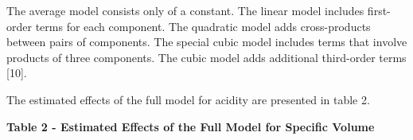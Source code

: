 
The average model consists only of a constant. The linear model includes
first-order terms for each component. The quadratic model adds
cross-products between pairs of components. The special cubic model
includes terms that involve products of three components. The cubic
model adds additional third-order terms {[}10{]}.

The estimated effects of the full model for acidity are presented in
table 2.

{\bfseries Table 2 - Estimated Effects of the Full Model for Specific
Volume}

